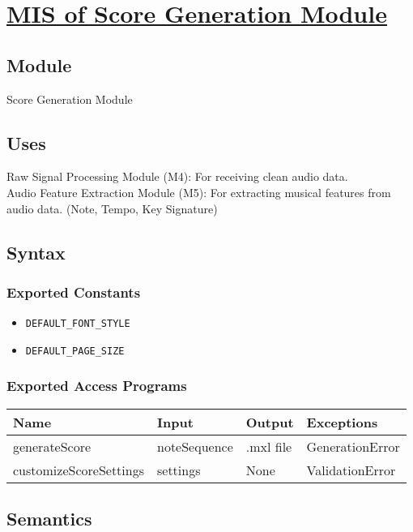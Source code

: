\documentclass[12pt, titlepage]{article}
\begin{document}
\section{\hyperref[mSG]{MIS of Score Generation Module}} \label{M3}  

\subsection{Module}  
Score Generation Module  

\subsection{Uses}  
Raw Signal Processing Module (M4): For receiving clean audio data. \\
Audio Feature Extraction Module (M5): For extracting musical features from audio data. (Note, Tempo, Key Signature) \\
\subsection{Syntax}  

\subsubsection{Exported Constants}  
\begin{itemize}
    \item \texttt{DEFAULT\_FONT\_STYLE}  
    \item \texttt{DEFAULT\_PAGE\_SIZE}  
\end{itemize}  

\subsubsection{Exported Access Programs}  
\begin{center}  
\begin{tabular}{|p{5cm}|p{4cm}|p{2cm}|p{3.5cm}|}  
\hline  
\textbf{Name} & \textbf{Input} & \textbf{Output} & \textbf{Exceptions} \\  
\hline  
generateScore & noteSequence & .mxl file & GenerationError \\  
customizeScoreSettings & settings & None & ValidationError \\  
\hline  
\end{tabular}  
\end{center}  

\subsection{Semantics}  
\end{document}
